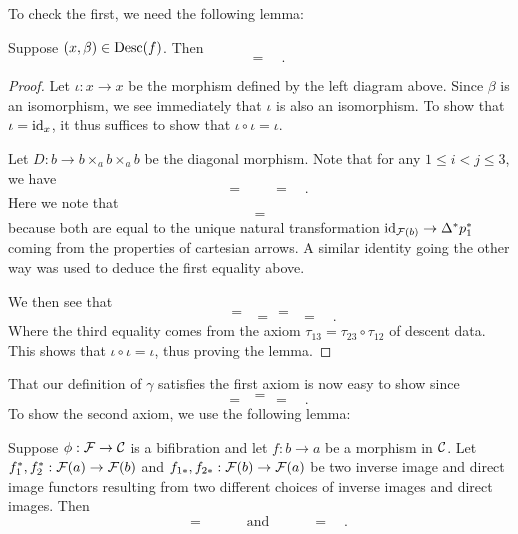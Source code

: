 \documentclass{amsart}
\begin{document}
    To check the first, we need the following lemma:
    \begin{lemma}
        Suppose $(x,\beta)\in \operatorname{Desc}(f)$.
        Then
        \[
            
            \quad=\quad
            
            .
        \]
    \end{lemma}
    \begin{proof}
        Let $\iota:x\to x$ be the morphism defined by the left diagram above.
        Since $\beta$ is an isomorphism, we see immediately that $\iota$ is also
            an isomorphism.
        To show that $\iota=\operatorname{id}_x$, it thus suffices to show that $\iota\circ \iota=\iota$.

        Let $D:b\to b\times_a b\times_a b$
            be the diagonal morphism.
        Note that for any $1\leq i<j\leq 3$, we have
        \[
            
            \quad=\quad
            
            \quad=\quad
            
            .
        \]
        Here we note that
        \[
            
            \quad = \quad
            
        \]
            because both are equal to the unique natural transformation
            $\operatorname{id}_{\mathcal F(b)}\to \Delta^\ast p_1^\ast$
            coming from the properties of cartesian arrows.
        A similar identity going the other way was used to deduce the first equality above.

        We then see that
        \[
            
            \quad=\quad
            
            \quad=\quad
            
        \]
        \[
            \quad\quad\quad\quad\quad=\quad
            
            \quad=\quad
            
            .
        \]
        Where the third equality comes from the axiom $\tau_{13}=\tau_{23}\circ \tau_{12}$ 
            of descent data.
        This shows that $\iota\circ\iota=\iota$, thus proving the lemma.
    \end{proof}
    That our definition of $\gamma$ satisfies the first axiom is now easy to show since
    \[
        
        \quad=\quad
        
    \]
    \[
        \quad=\quad
        
        \quad=\quad
        
        .
    \]
    To show the second axiom, we use the following lemma:
    \begin{lemma} \label{same-units-and-counits}
        Suppose $\phi:\mathcal F\to \mathcal C$ is a bifibration
            and let $f:b\to a$ be a morphism in $\mathcal C$.
        Let $f_1^\ast,f_2^\ast: \mathcal F(a)\to \mathcal F(b)$ and 
            $f_{1\ast},f_{2\ast}:\mathcal F(b)\to \mathcal F(a)$
            be two inverse image and direct image functors resulting from two
            different choices of inverse images and direct images.
        Then
        \[
            
            \quad
            =
            \quad
            
            \qquad\text{and}\qquad
            
            \quad=\quad
            
            .
        \]
    \end{lemma}
\end{document}
